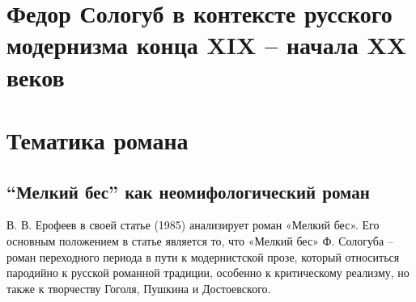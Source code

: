 \documentclass[12pt,a4paper]{article}
\begin{document}
\section{Федор Сологуб в контексте русского модернизма конца XIX -- начала XX веков}






\section{Тематика романа}
\subsection{\enquote{Мелкий бес} как неомифологический роман}

В. В. Ерофеев в своей статье  (1985) анализирует роман «Мелкий бес». Его основным положением в статье является то, что «Мелкий бес» Ф. Сологуба -- роман переходного периода в пути к модернистской прозе, который относиться пародийно к русской романной традиции, особенно к критическому реализму, но также к творчеству Гоголя, Пушкина и Достоевского. \parencite[145.]{jerofeev1985}
\end{document}
